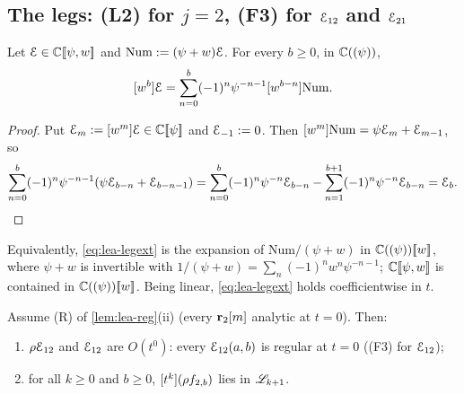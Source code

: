 \subsection{The legs: (L2) for \texorpdfstring{$j = 2$}{j = 2}, (F3) for \texorpdfstring{$\Edge_{12}$}{E12} and \texorpdfstring{$\mathcal{E}_{21}$}{E21}}
\label{sec:lea-legs}

\begin{lem}
\label{lem:lea-leg}
Let $\mathcal{E}\in\mathbb{C}[\![ \psi,w ]\!]$ and $\mathrm{Num} := (\psi+w)\mathcal{E}$. For every $b\geq 0$, in $\mathbb{C}((\psi))$,
\begin{equation}
\label{eq:lea-legext}
[w^b]\mathcal{E} = \sum_{n=0}^{b}(-1)^n\psi^{-n-1}[w^{b-n}]\mathrm{Num}.
\end{equation}
\end{lem}

\begin{proof}
Put $\mathcal{E}_m := [w^m]\mathcal{E}\in\mathbb{C}[\![ \psi ]\!]$ and $\mathcal{E}_{-1} := 0$. Then $[w^m]\mathrm{Num} = \psi\mathcal{E}_m + \mathcal{E}_{m-1}$, so
\[
\sum_{n=0}^{b}(-1)^n\psi^{-n-1}(\psi\mathcal{E}_{b-n} + \mathcal{E}_{b-n-1}) = \sum_{n=0}^{b}(-1)^n\psi^{-n}\mathcal{E}_{b-n} - \sum_{n=1}^{b+1}(-1)^n\psi^{-n}\mathcal{E}_{b-n} = \mathcal{E}_b .
\]
\end{proof}

Equivalently, \eqref{eq:lea-legext} is the expansion of $\mathrm{Num}/(\psi+w)$ in $\mathbb{C}((\psi))[\![ w ]\!]$, where $\psi+w$ is invertible with $1/(\psi+w) = \sum_n(-1)^nw^n\psi^{-n-1}$; $\mathbb{C}[\![ \psi,w ]\!]$ is contained in $\mathbb{C}((\psi))[\![ w ]\!]$. Being linear, \eqref{eq:lea-legext} holds coefficientwise in $t$.

\begin{prop}[(L2) for $j = 2$ and the regularity of $\Edge_{12}$]
\label{prop:lea-L2}
Assume (R) of \cref{lem:lea-reg}(ii) (every $\mathbf{r}_2[m]$ analytic at $t = 0$). Then:
\begin{enumerate}
\item $\rho\mathcal{E}_{12}$ and $\Edge_{12}$ are $O(t^0)$: every $\mathcal{E}_{12}(a,b)$ is regular at $t = 0$ ((F3) for $\Edge_{12}$);
\item for all $k\geq 0$ and $b\geq 0$, $[t^k](\rho f_{2,b})$ lies in $\mathscr{L}_{k+1}$.
\end{enumerate}
\end{prop}

